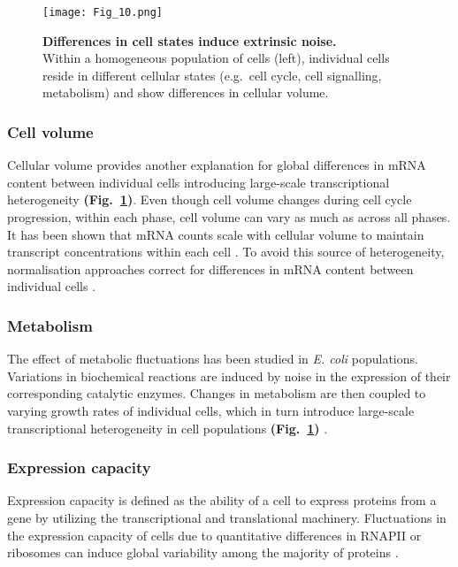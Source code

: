 \begin{figure}[!h]
\centering
\texttt{[image: Fig\_10.png]}
\caption[Differences in cell states induce extrinsic noise]{\textbf{Differences in cell states induce extrinsic noise.}\\
Within a homogeneous population of cells (left), individual cells reside in different cellular states (e.g.~cell cycle, cell signalling, metabolism) and show differences in cellular volume.}
\label{fig0:extrinsic}
\end{figure} 

\vspace{-5mm}

\subsubsection{Cell volume}

Cellular volume provides another explanation for global differences in mRNA content between individual cells introducing large-scale transcriptional heterogeneity \textbf{(Fig.~\ref{fig0:extrinsic})}. Even though cell volume changes during cell cycle progression, within each phase, cell volume can vary as much as across all phases. It has been shown that mRNA counts scale with cellular volume to maintain transcript concentrations within each cell \citep{Kempe2015, Padovan-Merhar2015, Zhurinsky2010}. To avoid this source of heterogeneity, normalisation approaches correct for differences in mRNA content between individual cells \citep{Vallejos2017}.

\subsubsection{Metabolism}

The effect of metabolic fluctuations has been studied in \textit{E. coli} populations. Variations in biochemical reactions are induced by noise in the expression of their corresponding catalytic enzymes. Changes in metabolism are then coupled to varying growth rates of individual cells, which in turn introduce large-scale transcriptional heterogeneity in cell populations \textbf{(Fig.~\ref{fig0:extrinsic})} \citep{Kiviet2014}.  

\subsubsection{Expression capacity}

Expression capacity is defined as the ability of a cell to express proteins from a gene by utilizing the transcriptional and translational machinery. Fluctuations in the expression capacity of cells due to quantitative differences in RNAPII or ribosomes can induce global variability among the majority of proteins \citep{Colman-Lerner2005}.

